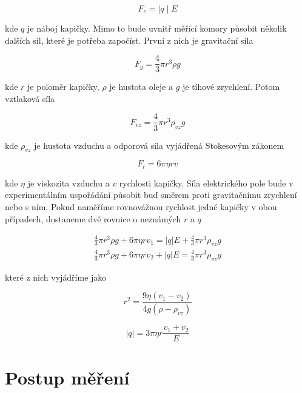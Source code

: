 \documentclass[a4paper,11pt]{article}
\begin{document}
\begin{equation}
F_e =  \mid q \mid E
\end{equation}

\noindent
kde $ q $ je náboj kapičky. Mimo to bude uvnitř měřící komory působit několik dalších sil, které je potřeba započíst. První z nich je gravitační síla

\begin{equation}
F_g = \frac{4}{3} \pi r^{3} \rho g
\end{equation}

\noindent
kde $ r $ je poloměr kapičky, $ \rho $ je hustota oleje a $ g $ je tíhové zrychlení. Potom vztlaková síla

\begin{equation}
F_{vz} =  \frac{4}{3} \pi r^{3} \rho_{vz} g
\end{equation}

\noindent
kde $ \rho_{vz} $ je hustota vzduchu a odporová síla vyjádřená Stokesovým zákonem

\begin{equation}
 F_t = 6 \pi \eta r v
\end{equation}

\noindent
kde $ \eta $ je viskozita vzduchu a $ v $ rychlosti kapičky. Síla elektrického pole bude v experimentálním uspořádání působit buď směrem proti gravitačnímu zrychlení nebo s ním. Pokud naměříme rovnovážnou rychlost jedné kapičky v obou případech, dostaneme dvě rovnice o neznámých $ r $ a $ q $ 

\begin{align*}
    \frac{4}{3} \pi r^{3} \rho g + 6 \pi \eta r v_1 = | q |  E + \frac{4}{3} \pi r^{3} \rho_{vz} g \\
    \frac{4}{3} \pi r^{3} \rho g + 6 \pi \eta r v_2  + | q |  E = \frac{4}{3} \pi r^{3} \rho_{vz} g
\end{align*}

\noindent
které z nich vyjádříme jako

\begin{equation}
r^2 = \frac{9 \eta (v_1 - v_2) }{4 g (\rho - \rho_{vz})}
\end{equation}

\begin{equation}
|q| = 3 \pi \eta r \frac{v_1 + v_2}{E}
\end{equation}

\section{Postup měření}
\end{document}
